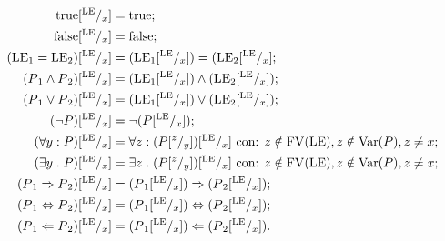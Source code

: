 \begin{align*}
  \mathrm{true}[^{\mathrm{LE}}/_ x ] 
    &= \mathrm{true};\\
  \mathrm{false}[^{\mathrm{LE}}/_ x ] 
    &= \mathrm{false};\\
  (\mathrm{LE}{_1} = \mathrm{LE}{_2})[^{\mathrm{LE}}/_ x ] 
    &= (\mathrm{LE}{_1}[^{\mathrm{LE}}/_ x ]) = (\mathrm{LE}{_2}[^{\mathrm{LE}}/_ x ]; \\
  (P{_1} \wedge P{_2})[^{\mathrm{LE}}/_ x ] 
    &= (\mathrm{LE}{_1}[^{\mathrm{LE}}/_ x ]) \wedge (\mathrm{LE}{_2}[^{\mathrm{LE}}/_x]);\\
  (P{_1} \vee P{_2})[^{\mathrm{LE}}/_ x ] 
    &= (\mathrm{LE}{_1}[^{\mathrm{LE}}/_ x ]) \vee (\mathrm{LE}{_2}[^{\mathrm{LE}}/_ x ]);\\
  (\neg P)[^{\mathrm{LE}}/_ x ] 
    &= \neg(P[^{\mathrm{LE}}/_ x ]);\\
  (\forall y\mathrel{:} P)[^{\mathrm{LE}}/_x ] 
    &= \forall z\mathrel{:} (P[^z/_y])[^{\mathrm{LE}}/_x] \text{ con: $z\notin\mathrm{FV}(\mathrm{LE}), z\notin\mathrm{Var}(P),z\neq x$};\\
  (\exists  y\mathrel{.} P)[^{\mathrm{LE}}/_x] 
    &= \exists z\mathrel{.} (P[^z/_y])[^{\mathrm{LE}}/_x] \text{ con: $z\notin\mathrm{FV}(\mathrm{LE}),  z\notin\mathrm{Var}(P), z\neq x$};\\
  (P{_1} \Rightarrow P{_2})[^{\mathrm{LE}}/_ x ] 
    &= (P{_1}[^{\mathrm{LE}}/_x]) \Rightarrow (P{_2}[^{\mathrm{LE}}/_x]);\\
  (P{_1} \Leftrightarrow P{_2})[^{\mathrm{LE}}/_ x ] 
    &= (P{_1}[^{\mathrm{LE}}/_x]) \Leftrightarrow (P{_2}[^{\mathrm{LE}}/_x]); \\
  (P{_1} \Leftarrow P{_2})[^{\mathrm{LE}}/_x] 
    &= (P{_1}[^{\mathrm{LE}}/_x]) \Leftarrow (P{_2}[^{\mathrm{LE}}/_x]).
\end{align*}
